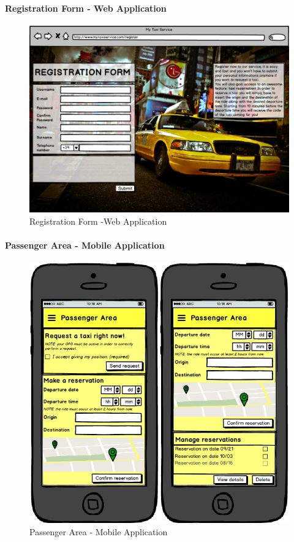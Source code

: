 \paragraph{Registration Form - Web Application}
\begin{figure}[!h]
	\begin{center}
		\includegraphics[scale=0.45]{../SE2_MOCKUPS/WebAppRegistrationForm.png}
		\caption{Registration Form -Web Application}	
	\end{center}
\end{figure}
\newpage
\paragraph{Passenger Area - Mobile Application}
\begin{figure}[!h]
	\begin{center}
		\includegraphics[scale=0.5]{../SE2_MOCKUPS/MobileAppPassengerArea.png}
		\caption{Passenger Area - Mobile Application}
	\end{center}	
\end{figure}
\newpage
